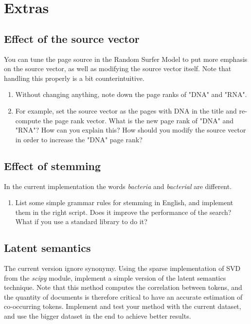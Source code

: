 \documentclass[mathserif, 11pt,c]{article}
\begin{document}
\section{Extras}

\subsection{Effect of the source vector}
You can tune the page source in the Random Surfer Model to put more emphasis on the source vector, as well as modifying the source vector itself.
Note that handling this properly is a bit counterintuitive.


\begin{enumerate}[label=\textbf{Q\thesection.\arabic*}]
	\item Without changing anything, note down the page ranks of "DNA" and "RNA".
	\item For example, set the source vector as the pages with DNA in the title and re-compute the page rank vector. What is the new page rank of "DNA" and "RNA"? How can you explain this? How should you modify the source vector in order to increase the "DNA" page rank?
\end{enumerate}

\subsection{Effect of stemming}	

In the current implementation the words \textit{bacteria} and \textit{bacterial} are different. 
\begin{enumerate}[label=\textbf{Q\thesection.\arabic*}]
	\item List some simple grammar rules for stemming in English, and implement them in the right script. Does it improve the performance of the search? What if you use a standard library to do it?
\end{enumerate}

\subsection{Latent semantics}

The current version ignore synonymy. Using the sparse implementation of SVD from the \textit{scipy} module, implement a simple version of the latent semantics technique. Note that this method computes the correlation between tokens, and the quantity of documents is therefore critical to have an accurate estimation of co-occurring tokens. Implement and test your method with the current dataset, and use the bigger dataset in the end to achieve better results.



%
\end{document}
